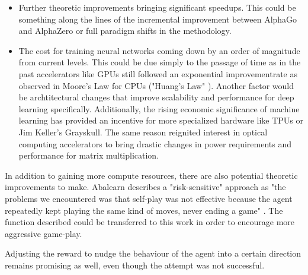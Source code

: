 \begin{itemize}
    \item Further theoretic improvements bringing significant speedups. This could be something along the lines of the incremental improvement between AlphaGo and AlphaZero or full paradigm shifts in the methodology.
    \item The cost for training neural networks coming down by an order of magnitude from current levels. This could be due simply to the passage of time as in the past accelerators like GPUs still followed an exponential improvementrate as observed in Moore's Law for CPUs \cite{moore_cramming_2006} ("Huang's Law" \cite{noauthor_huangs_2021}). Another factor would be archtitectural changes that improve scalability and performance for deep learning specifically. Additionally, the rising economic significance of machine learning has provided an incentive for more specialized hardware like TPUs \cite{noauthor_tpu_nodate} or Jim Keller's Grayskull. \cite{noauthor_grayskull_nodate} The same reason reignited interest in optical computing accelerators to bring drastic changes in power requirements and performance for matrix multiplication. \cite{noauthor_lightmatter_nodate,noauthor_lightelligence_nodate}
\end{itemize}

In addition to gaining more compute resources, there are also potential theoretic improvements to make. Abalearn describes a "risk-sensitive" approach as "the problems we encountered was that self-play was not effective because the agent repeatedly kept playing the same kind of moves, never ending a game" \cite[p. 8]{campos_abalearn_2003}. The function described could be transferred to this work in order to encourage more aggressive game-play.

Adjusting the reward to nudge the behaviour of the agent into a certain direction remains promising as well, even though the attempt was not successful.